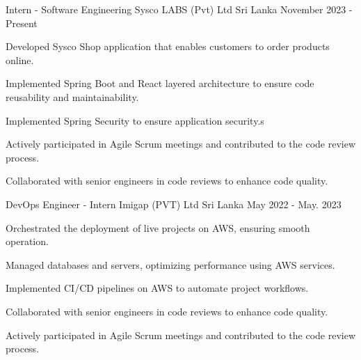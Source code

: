 

\begin{cventries}

  \cventry
  {Intern - Software Engineering} %
  {Sysco LABS (Pvt) Ltd} %
  {Sri Lanka} %
  {November 2023 - Present} %
  {
    \begin{cvitems} %
      \item {Developed Sysco Shop application that enables customers to order products online.}
      \item {Implemented Spring Boot and React layered architecture to ensure code reusability and maintainability.}
      \item {Implemented Spring Security to ensure application security.}s
      \item {Actively participated in Agile Scrum meetings and contributed to the code review process.}
      \item {Collaborated with senior engineers in code reviews to enhance code quality.}
    \end{cvitems}
  }

  \cventry
  {DevOps Engineer - Intern} %
  {Imigap (PVT) Ltd} %
  {Sri Lanka} %
  {May 2022 - May. 2023} %
  {
    \begin{cvitems} %
      \item {Orchestrated the deployment of live projects on AWS, ensuring smooth operation.}
      \item {Managed databases and servers, optimizing performance using AWS services.}
      \item {Implemented CI/CD pipelines on AWS to automate project workflows.}
      \item {Collaborated with senior engineers in code reviews to enhance code quality.}
      \item {Actively participated in Agile Scrum meetings and contributed to the code review process.}
    \end{cvitems}
  }


\end{cventries}
